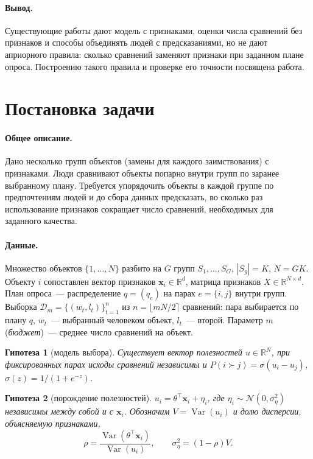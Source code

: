 \documentclass{article}
\newtheorem{assumption}{Гипотеза}
\theoremstyle{definition}
\theoremstyle{remark}
\newcommand{\R}{\mathbb{R}}
\newcommand{\Var}{\operatorname{Var}}
\newcommand{\bx}{\mathbf{x}}
\begin{document}
\paragraph{Вывод.}
Существующие работы дают модель с признаками, оценки числа сравнений без признаков и способы объединять людей с предсказаниями, но не дают априорного правила: сколько сравнений заменяют признаки при заданном плане опроса. Построению такого правила и проверке его точности посвящена работа.

\section{Постановка задачи}
\label{sec:problem}

\paragraph{Общее описание.}
Дано несколько групп объектов (замены для каждого заимствования) с признаками. Люди сравнивают объекты попарно внутри групп по заранее выбранному плану. Требуется упорядочить объекты в каждой группе по предпочтениям людей и до сбора данных предсказать, во сколько раз использование признаков сокращает число сравнений, необходимых для заданного качества.

\paragraph{Данные.}
Множество объектов $\{1,\dots,N\}$ разбито на $G$ групп $S_1,\dots,S_G$, $|S_g|=K$, $N=GK$. Объекту $i$ сопоставлен вектор признаков $\bx_i\in\R^d$, матрица признаков $X\in\R^{N\times d}$. План опроса~--- распределение $q=(q_e)$ на парах $e=\{i,j\}$ внутри групп. Выборка $\mathcal D_m=\{(w_t,l_t)\}_{t=1}^{n}$ из $n=\lfloor mN/2\rceil$ сравнений: пара выбирается по плану $q$, $w_t$~--- выбранный человеком объект, $l_t$~--- второй. Параметр $m$ (\emph{бюджет})~--- среднее число сравнений на объект.

\begin{assumption}[модель выбора]\label{as:bt}
Существует вектор полезностей $u\in\R^N$, при фиксированных парах исходы сравнений независимы и $P(i\succ j)=\sigma(u_i-u_j)$, $\sigma(z)=1/(1+e^{-z})$.
\end{assumption}

\begin{assumption}[порождение полезностей]\label{as:hier}
$u_i=\theta^{\top}\bx_i+\eta_i$, где $\eta_i\sim\mathcal N(0,\sigma_\eta^2)$ независимы между собой и с $\bx_i$. Обозначим $V=\Var(u_i)$ и долю дисперсии, объясняемую признаками,
\begin{equation}\label{eq:rho}
\rho=\frac{\Var(\theta^{\top}\bx_i)}{\Var(u_i)}, \qquad \sigma_\eta^2=(1-\rho)V.
\end{equation}
\end{assumption}
\end{document}
